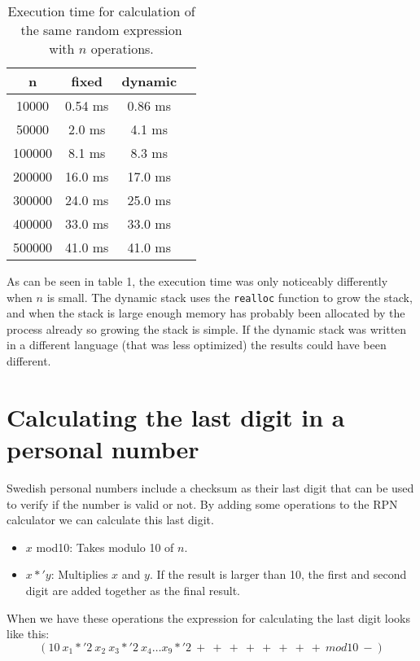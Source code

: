 \documentclass[a4paper,11pt]{article}
\begin{document}
\begin{table}[H]
\centering
\begin{tabular}{|c|c|c|c|}
\hline
\textbf{n} & \textbf{fixed} & \textbf{dynamic} \\
\hline
	10000 & 0.54 ms & 0.86 ms \\
	50000 & 2.0 ms & 4.1 ms \\
	100000 & 8.1 ms & 8.3 ms \\
	200000 & 16.0 ms & 17.0 ms \\
	300000 & 24.0 ms & 25.0 ms \\
	400000 & 33.0 ms & 33.0 ms \\
	500000 & 41.0 ms & 41.0 ms \\
\hline
\end{tabular}
\caption{Execution time for calculation of the same random expression with $n$ operations.}
\label{tab:table1}
\end{table}

As can be seen in table 1, the execution time was only noticeably differently when $n$ is small. The dynamic stack uses the \texttt{realloc} function to grow the stack,
and when the stack is large enough memory has probably been allocated by the process already so growing the stack is simple. If the dynamic stack was written in a different language
(that was less optimized) the results could have been different.

\section*{Calculating the last digit in a personal number}

Swedish personal numbers include a checksum as their last digit that can be used to verify if the number is valid or not. By adding some operations to the RPN calculator we can calculate this last digit.

\begin{itemize}
	\item $x$ mod10: Takes modulo 10 of $n$.
	\item \emph{$x *' y$}: Multiplies $x$ and $y$. If the result is larger than 10, the first and second digit are added together as the final result.
\end{itemize}

When we have these operations the expression for calculating the last digit looks like this:
\begin{equation*}
(10 \ x_1 *' 2 \ x_2 \ x_3 *' 2 \ x_4 \ldots x_9 *' 2 \ + \ + \ + \ + \ + \ + \ + \ + \ mod10 \ -)
\end{equation*}
\end{document}
